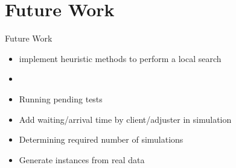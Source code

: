


\section{Future Work}
\begin{frame}{Future Work}
  \begin{itemize}
  \item{} implement heuristic methods to perform a local search
  \item{}
  \item Running pending tests
  \item Add waiting/arrival time by client/adjuster in simulation
  \item Determining required number of simulations
  \item Generate instances from real data
  \end{itemize}
\end{frame}
